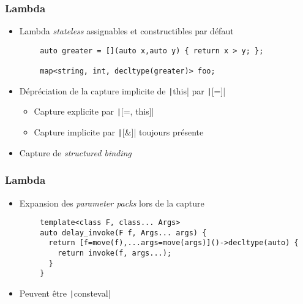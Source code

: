 \documentclass[C++.tex]{subfiles}
\begin{document}
\begin{frame}[fragile]
	\frametitle{Lambda}
	\begin{itemize}
		\item Lambda \textit{stateless} assignables et constructibles par défaut

	\end{itemize}

	\begin{verbatim}
		auto greater = [](auto x,auto y) { return x > y; };

		map<string, int, decltype(greater)> foo;
	\end{verbatim}

	\begin{itemize}
		\item Dépréciation de la capture implicite de \texttt|this| par \texttt|[=]|
		\begin{itemize}
			\item Capture explicite par \texttt|[=, this]|


			\item Capture implicite par \texttt|[&]| toujours présente
		\end{itemize}
		\item Capture de \textit{structured binding}
	\end{itemize}

\end{frame}

\begin{frame}[fragile]
	\frametitle{Lambda}
	\begin{itemize}
		\item Expansion des \textit{parameter packs} lors de la capture
	\end{itemize}

	\begin{verbatim}
		template<class F, class... Args>
		auto delay_invoke(F f, Args... args) {
		  return [f=move(f),...args=move(args)]()->decltype(auto) {
		    return invoke(f, args...);
		  }
		}
	\end{verbatim}

	\begin{itemize}
		\item Peuvent être \texttt|consteval|
	\end{itemize}

\end{frame}
\end{document}
